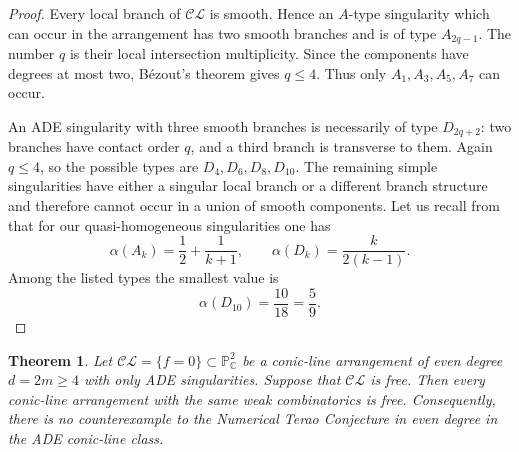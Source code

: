 \documentclass[10pt,a4paper]{amsart}
\newtheorem{theorem}{Theorem}[section]
\begin{document}
\begin{proof}
Every local branch of $\mathcal{CL}$ is smooth.  Hence an $A$-type singularity
which can occur in the arrangement has two smooth branches and is of type
$A_{2q-1}$.  The number $q$ is their local intersection multiplicity.  Since
the components have degrees at most two, B\'ezout's theorem gives $q\le4$.
Thus only $A_1,A_3,A_5,A_7$ can occur.

An ADE singularity with three smooth branches is necessarily of type
$D_{2q+2}$: two branches have contact order $q$, and a third branch is
transverse to them.  Again $q\le4$, so the possible types are
$D_4,D_6,D_8,D_{10}$.  The remaining simple singularities have either a
singular local branch or a different branch structure and therefore cannot occur in a union of smooth components. Let us recall from \cite{DimcaSernesi} that for our quasi-homogeneous singularities one has
\[
 \alpha(A_k)=\frac12+\frac1{k+1},
 \qquad
 \alpha(D_k)=\frac{k}{2(k-1)}.
\]
Among the listed types the smallest value is
\[
 \alpha(D_{10})=\frac{10}{18}=\frac59.
\]
\end{proof}

\begin{theorem}\label{thm:even}
Let $\mathcal{CL} = \{f=0\} \subset \mathbb{P}^{2}_{\mathbb{C}}$ be a conic-line arrangement of even degree
$d=2m\ge4$ with only ADE singularities.  Suppose that $\mathcal{CL}$ is free. Then every conic-line arrangement with the same weak combinatorics is free. Consequently, there is no counterexample to the Numerical Terao Conjecture in even degree in the ADE conic-line class.
\end{theorem}
\end{document}
